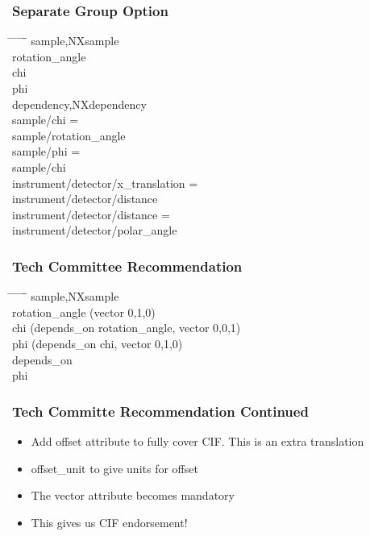 \documentclass{beamer}
\begin{document}
\begin{frame} \frametitle{Separate Group Option}
\begin{tabbing}
\hspace*{1cm} \= \hspace*{1cm} \= \hspace*{1cm} \= \hspace*{1cm} \= \hspace*{1cm} \= \hspace*{1cm}\= \kill
\>sample,NXsample\\
\> \>rotation\_angle\\
\> \>chi \\
\> \>phi \\
\>dependency,NXdependency\\
\> \>sample/chi = \\
\> \> \>sample/rotation\_angle\\
\> \>sample/phi =\\
\> \> \> sample/chi\\
\> \>instrument/detector/x\_translation = \\
\> \> \>instrument/detector/distance\\
\> \>instrument/detector/distance = \\
\> \> \>instrument/detector/polar\_angle\\
\end{tabbing}
\end{frame}

\begin{frame} \frametitle{Tech Committee Recommendation}
\begin{tabbing}
\hspace*{1cm} \= \hspace*{1cm} \= \hspace*{1cm} \= \hspace*{1cm} \= \hspace*{1cm} \= \hspace*{1cm}\= \kill
\>sample,NXsample\\
\> \>rotation\_angle (vector 0,1,0)\\
\> \>chi (depends\_on rotation\_angle, vector 0,0,1)\\
\> \>phi (depends\_on chi, vector 0,1,0)\\
\> \>depends\_on \\
\> \> \>phi \\
\end{tabbing}
\end{frame}

\begin{frame}
\frametitle{Tech Committe Recommendation Continued}
\begin{itemize}
\item Add offset attribute to fully cover CIF. This is an extra translation
\item offset\_unit to give units for offset
\item The vector attribute becomes mandatory
\item This gives us CIF endorsement! 
\end{itemize}
\end{frame}
\end{document}
